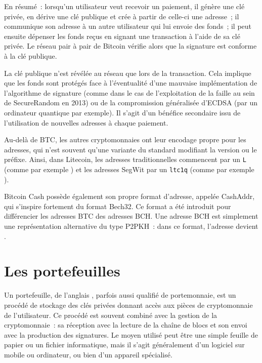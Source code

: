 En résumé~: lorsqu'un utilisateur veut recevoir un paiement, il génère une clé privée, en dérive une clé publique et crée à partir de celle-ci une adresse~; il communique son adresse à un autre utilisateur qui lui envoie des fonds~; il peut ensuite dépenser les fonds reçus en signant une transaction à l'aide de sa clé privée. Le réseau pair à pair de Bitcoin vérifie alors que la signature est conforme à la clé publique.

La clé publique n'est révélée au réseau que lors de la transaction. Cela implique que les fonds sont protégés face à l'éventualité d'une mauvaise implémentation de l'algorithme de signature (comme dans le cas de l'exploitation de la faille au sein de SecureRandom en 2013) ou de la compromission généralisée d'ECDSA (par un ordinateur quantique par exemple). Il s'agit d'un bénéfice secondaire issu de l'utilisation de nouvelles adresses à chaque paiement.

Au-delà de BTC, les autres cryptomonnaies ont leur encodage propre pour les adresses, qui n'est souvent qu'une variante du standard modifiant la version ou le préfixe. Ainsi, dans Litecoin, les adresses traditionnelles commencent par un \texttt{L} (comme par exemple ) et les adresses SegWit par un \texttt{ltc1q} (comme par exemple ).

Bitcoin Cash possède également son propre format d'adresse, appelée CashAddr, qui s'inspire fortement du format Bech32. Ce format a été introduit pour différencier les adresses BTC des adresses BCH. Une adresse BCH est simplement une représentation alternative du type P2PKH~: dans ce format, l'adresse  devient .

\section*{Les portefeuilles}


Un portefeuille, de l'anglais , parfois aussi qualifié de portemonnaie, est un procédé de stockage des clés privées donnant accès aux pièces de cryptomonnaie de l'utilisateur. Ce procédé est souvent combiné avec la gestion de la cryptomonnaie~: sa réception avec la lecture de la chaîne de blocs et son envoi avec la production des signatures. Le moyen utilisé peut être une simple feuille de papier ou un fichier informatique, mais il s'agit généralement d'un logiciel sur mobile ou ordinateur, ou bien d'un appareil spécialisé.

